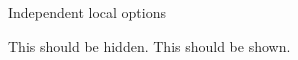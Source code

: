 \documentclass{article}
\begin{document}
{Independent local options}

This  should be hidden. This  should be shown.
\end{document}

